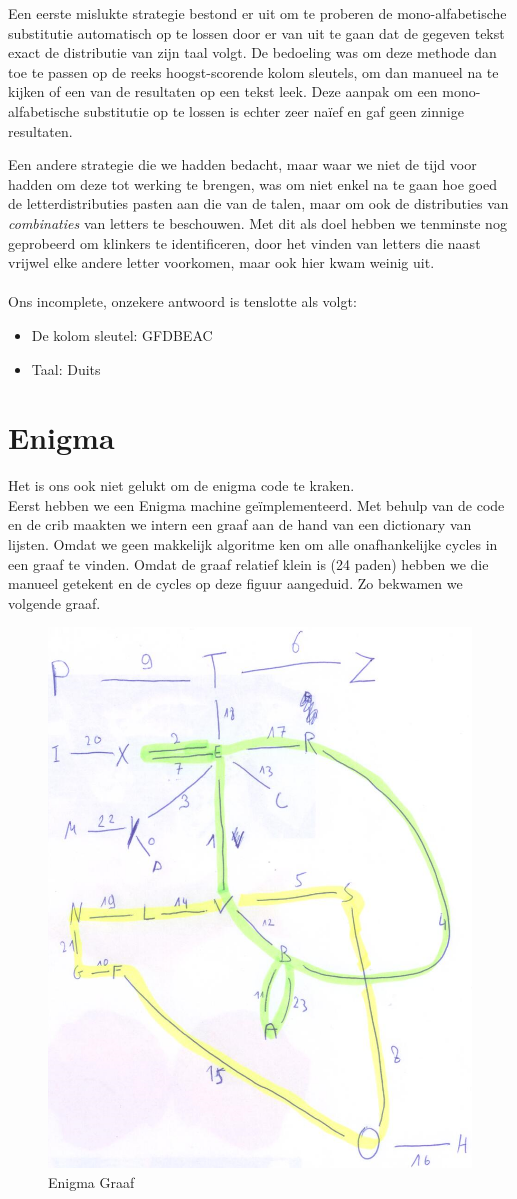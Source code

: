 \documentclass[fleqn]{article}
\begin{document}
	Een eerste mislukte strategie bestond er uit om te proberen de mono-alfabetische substitutie automatisch op te lossen door er van uit te gaan dat de gegeven tekst exact de distributie van zijn taal volgt. De bedoeling was om deze methode dan toe te passen op de reeks hoogst-scorende kolom sleutels, om dan manueel na te kijken of een van de resultaten op een tekst leek. Deze aanpak om een mono-alfabetische substitutie op te lossen is echter zeer na\"ief en gaf geen zinnige resultaten.
	
	Een andere strategie die we hadden bedacht, maar waar we niet de tijd voor hadden om deze tot werking te brengen, was om niet enkel na te gaan hoe goed de letterdistributies pasten aan die van de talen, maar om ook de distributies van \textit{combinaties} van letters te beschouwen. Met dit als doel hebben we tenminste nog geprobeerd om klinkers te identificeren, door het vinden van letters die naast vrijwel elke andere letter voorkomen, maar ook hier kwam weinig uit.\\\\	
	Ons incomplete, onzekere antwoord is tenslotte als volgt:
	\begin{itemize}
		\setlength\itemsep{0pt}
		\item De kolom sleutel: GFDBEAC
		\item Taal: Duits
	\end{itemize}
	
	\section{Enigma}
	Het is ons ook niet gelukt om de enigma code te kraken.\\
	Eerst hebben we een Enigma machine ge\"{i}mplementeerd. Met behulp van de code en de crib maakten we intern een graaf aan de hand van een dictionary van lijsten. Omdat we geen makkelijk algoritme ken om alle onafhankelijke cycles in een graaf te vinden. Omdat de graaf relatief klein is (24 paden) hebben we die manueel getekent en de cycles op deze figuur aangeduid. Zo bekwamen we volgende graaf. 
	\begin{figure}[h!]
		\centering
		\includegraphics[width=0.5\linewidth]{Enigma}
		\caption[]{Enigma Graaf}
		\label{fig:enigma}
	\end{figure}
\end{document}
